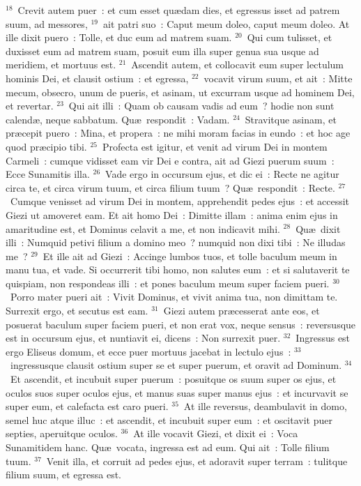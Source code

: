 ${}^{18}$~Crevit autem puer~: et cum esset qu\ae dam dies, et egressus isset ad patrem suum, ad messores,
${}^{19}$~ait patri suo~: Caput meum doleo, caput meum doleo. At ille dixit puero~: Tolle, et duc eum ad matrem suam.
${}^{20}$~Qui cum tulisset, et duxisset eum ad matrem suam, posuit eum illa super genua sua usque ad meridiem, et mortuus est.
${}^{21}$~Ascendit autem, et collocavit eum super lectulum hominis Dei, et clausit ostium~: et egressa,
${}^{22}$~vocavit virum suum, et ait~: Mitte mecum, obsecro, unum de pueris, et asinam, ut excurram usque ad hominem Dei, et revertar.
${}^{23}$~Qui ait illi~: Quam ob causam vadis ad eum~? hodie non sunt calend\ae , neque sabbatum. Qu\ae\ respondit~: Vadam.
${}^{24}$~Stravitque asinam, et pr\ae cepit puero~: Mina, et propera~: ne mihi moram facias in eundo~: et hoc age quod pr\ae cipio tibi.
${}^{25}$~Profecta est igitur, et venit ad virum Dei in montem Carmeli~: cumque vidisset eam vir Dei e contra, ait ad Giezi puerum suum~: Ecce Sunamitis illa.
${}^{26}$~Vade ergo in occursum ejus, et dic ei~: Recte ne agitur circa te, et circa virum tuum, et circa filium tuum~? Qu\ae\ respondit~: Recte.
${}^{27}$~Cumque venisset ad virum Dei in montem, apprehendit pedes ejus~: et accessit Giezi ut amoveret eam. Et ait homo Dei~: Dimitte illam~: anima enim ejus in amaritudine est, et Dominus celavit a me, et non indicavit mihi.
${}^{28}$~Qu\ae\ dixit illi~: Numquid petivi filium a domino meo~? numquid non dixi tibi~: Ne illudas me~?
${}^{29}$~Et ille ait ad Giezi~: Accinge lumbos tuos, et tolle baculum meum in manu tua, et vade. Si occurrerit tibi homo, non salutes eum~: et si salutaverit te quispiam, non respondeas illi~: et pones baculum meum super faciem pueri.
${}^{30}$~Porro mater pueri ait~: Vivit Dominus, et vivit anima tua, non dimittam te. Surrexit ergo, et secutus est eam.
${}^{31}$~Giezi autem pr\ae cesserat ante eos, et posuerat baculum super faciem pueri, et non erat vox, neque sensus~: reversusque est in occursum ejus, et nuntiavit ei, dicens~: Non surrexit puer.
${}^{32}$~Ingressus est ergo Eliseus domum, et ecce puer mortuus jacebat in lectulo ejus~:
${}^{33}$~ingressusque clausit ostium super se et super puerum, et oravit ad Dominum.
${}^{34}$~Et ascendit, et incubuit super puerum~: posuitque os suum super os ejus, et oculos suos super oculos ejus, et manus suas super manus ejus~: et incurvavit se super eum, et calefacta est caro pueri.
${}^{35}$~At ille reversus, deambulavit in domo, semel huc atque illuc~: et ascendit, et incubuit super eum~: et oscitavit puer septies, aperuitque oculos.
${}^{36}$~At ille vocavit Giezi, et dixit ei~: Voca Sunamitidem hanc. Qu\ae\ vocata, ingressa est ad eum. Qui ait~: Tolle filium tuum.
${}^{37}$~Venit illa, et corruit ad pedes ejus, et adoravit super terram~: tulitque filium suum, et egressa est.


